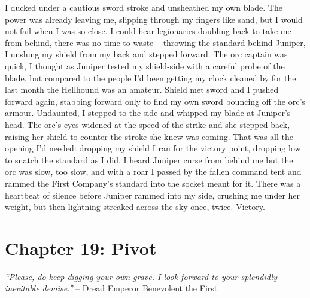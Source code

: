 \documentclass[12pt, openany]{book}
\begin{document}
I ducked under a cautious sword stroke and unsheathed my own blade. The power was already leaving me, slipping through my fingers like sand, but I would not fail when I was so close. I could hear legionaries doubling back to take me from behind, there was no time to waste – throwing the standard behind Juniper, I unslung my shield from my back and stepped forward. The orc captain was quick, I thought as Juniper tested my shield-side with a careful probe of the blade, but compared to the people I’d been getting my clock cleaned by for the last month the Hellhound was an amateur. Shield met sword and I pushed forward again, stabbing forward only to find my own sword bouncing off the orc’s armour. Undaunted, I stepped to the side and whipped my blade at Juniper’s head. The orc’s eyes widened at the speed of the strike and she stepped back, raising her shield to counter the stroke she knew was coming. That was all the opening I’d needed: dropping my shield I ran for the victory point, dropping low to snatch the standard as I did. I heard Juniper curse from behind me but the orc was slow, too slow, and with a roar I passed by the fallen command tent and rammed the First Company’s standard into the socket meant for it. There was a heartbeat of silence before Juniper rammed into my side, crushing me under her weight, but then lightning streaked across the sky once, twice.
Victory.
\clearpage
\chapter{Chapter 19: Pivot}

\textit{“Please, do keep digging your own grave. I look forward to your splendidly inevitable demise.”}
– Dread Emperor Benevolent the First
\end{document}
